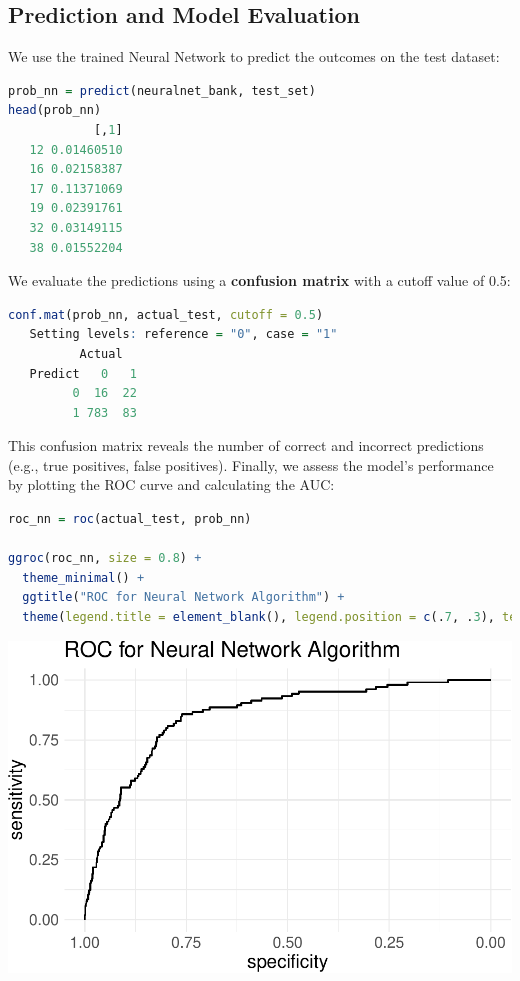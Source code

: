 \documentclass[
]{book}
\theoremstyle{definition}
\theoremstyle{definition}
\theoremstyle{definition}
\theoremstyle{definition}
\theoremstyle{remark}
\begin{document}
\subsection*{Prediction and Model Evaluation}\label{prediction-and-model-evaluation-1}

We use the trained Neural Network to predict the outcomes on the test dataset:

\begin{lstlisting}[language=R]
prob_nn = predict(neuralnet_bank, test_set)
head(prob_nn)
            [,1]
   12 0.01460510
   16 0.02158387
   17 0.11371069
   19 0.02391761
   32 0.03149115
   38 0.01552204
\end{lstlisting}

We evaluate the predictions using a \textbf{confusion matrix} with a cutoff value of 0.5:

\begin{lstlisting}[language=R]
conf.mat(prob_nn, actual_test, cutoff = 0.5)
   Setting levels: reference = "0", case = "1"
          Actual
   Predict   0   1
         0  16  22
         1 783  83
\end{lstlisting}

This confusion matrix reveals the number of correct and incorrect predictions (e.g., true positives, false positives). Finally, we assess the model's performance by plotting the ROC curve and calculating the AUC:

\begin{lstlisting}[language=R]
roc_nn = roc(actual_test, prob_nn)

ggroc(roc_nn, size = 0.8) + 
  theme_minimal() + 
  ggtitle("ROC for Neural Network Algorithm") +
  theme(legend.title = element_blank(), legend.position = c(.7, .3), text = element_text(size = 17))
\end{lstlisting}

\begin{center}\includegraphics{nn_files/figure-latex/unnamed-chunk-14-1} \end{center}
\end{document}

